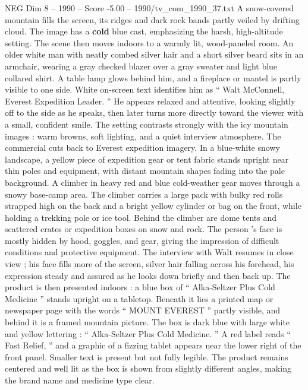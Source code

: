 \begin{textsample}{NEG Dim 8 – 1990 – Score -5.00 – 1990/tv\_com\_1990\_37.txt}  \label{ex:f8_neg_031}
A snow-covered mountain fills the screen, its ridges and dark rock bands partly veiled by drifting cloud.
The image has a \textbf{cold} blue cast, emphasizing the harsh, high-altitude setting.
The scene then moves indoors to a warmly lit, wood-paneled room.
An older white man with neatly combed silver hair and a short silver beard sits in an armchair, wearing a gray checked blazer over a gray sweater and light blue collared shirt.
A table lamp glows behind him, and a fireplace or mantel is partly visible to one side.
White on-screen text identifies him as “ Walt McConnell, Everest Expedition Leader. ” He appears relaxed and attentive, looking slightly off to the side as he speaks, then later turns more directly toward the viewer with a small, confident smile.
The setting contrasts strongly with the icy mountain images : warm browns, soft lighting, and a quiet interview atmosphere.
The commercial cuts back to Everest expedition imagery.
In a blue-white snowy landscape, a yellow piece of expedition gear or tent fabric stands upright near thin poles and equipment, with distant mountain shapes fading into the pale background.
A climber in heavy red and blue cold-weather gear moves through a snowy base-camp area.
The climber carries a large pack with bulky red rolls strapped high on the back and a bright yellow cylinder or bag on the front, while holding a trekking pole or ice tool.
Behind the climber are dome tents and scattered crates or expedition boxes on snow and rock.
The person ’s face is mostly hidden by hood, goggles, and gear, giving the impression of difficult conditions and protective equipment.
The interview with Walt resumes in close view ; his face fills more of the screen, silver hair falling across his forehead, his expression steady and assured as he looks down briefly and then back up.
The product is then presented indoors : a blue box of “ Alka-Seltzer Plus Cold Medicine ” stands upright on a tabletop.
Beneath it lies a printed map or newspaper page with the words “ MOUNT EVEREST ” partly visible, and behind it is a framed mountain picture.
The box is dark blue with large white and yellow lettering : “ Alka-Seltzer Plus Cold Medicine. ” A red label reads “ Fast Relief, ” and a graphic of a fizzing tablet appears near the lower right of the front panel.
Smaller text is present but not fully legible.
The product remains centered and well lit as the box is shown from slightly different angles, making the brand name and medicine type clear.

\end{textsample}
